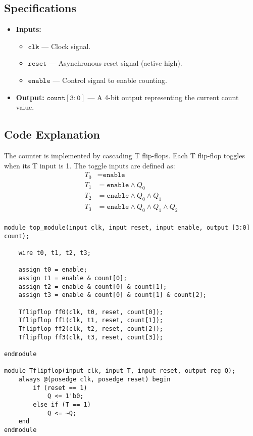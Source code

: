 \documentclass[11pt]{article}
\begin{document}
\subsection{Specifications}
\begin{itemize}
    \item \textbf{Inputs:}
    \begin{itemize}
        \item \(\mathtt{clk}\) --- Clock signal.
        \item \(\mathtt{reset}\) --- Asynchronous reset signal (active high).
        \item \(\mathtt{enable}\) --- Control signal to enable counting.
    \end{itemize}
    \item \textbf{Output:} \(\mathtt{count[3:0]}\) --- A 4-bit output representing the current count value.
\end{itemize}

\subsection{Code Explanation}
The counter is implemented by cascading T flip-flops. Each T flip-flop toggles when its T input is 1. The toggle inputs are defined as:
\[
\begin{aligned}
T_0 &= \texttt{enable} \\
T_1 &= \texttt{enable} \land Q_0 \\
T_2 &= \texttt{enable} \land Q_0 \land Q_1 \\
T_3 &= \texttt{enable} \land Q_0 \land Q_1 \land Q_2 \\
\end{aligned}
\]

\begin{lstlisting}[style=verilogstyle, caption={4-bit Up Counter}]
module top_module(input clk, input reset, input enable, output [3:0] count);

    wire t0, t1, t2, t3;

    assign t0 = enable;
    assign t1 = enable & count[0];
    assign t2 = enable & count[0] & count[1];
    assign t3 = enable & count[0] & count[1] & count[2];   
    
    Tflipflop ff0(clk, t0, reset, count[0]);
    Tflipflop ff1(clk, t1, reset, count[1]);
    Tflipflop ff2(clk, t2, reset, count[2]);
    Tflipflop ff3(clk, t3, reset, count[3]);

endmodule

module Tflipflop(input clk, input T, input reset, output reg Q);
    always @(posedge clk, posedge reset) begin
        if (reset == 1)
            Q <= 1'b0;
        else if (T == 1)
            Q <= ~Q;
    end
endmodule
\end{lstlisting}
\end{document}
